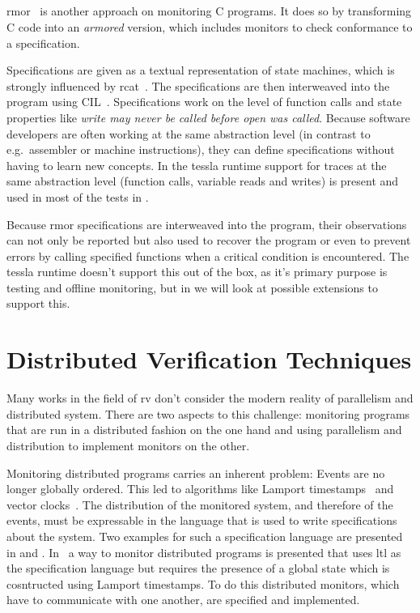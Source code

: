 \subsection{}
\label{sec:related:c_programs:rmor}

\gls{rmor}~\citep{Havelund2008} is another approach on monitoring C programs.
It does so by transforming C code into an \emph{armored} version, which includes monitors to check conformance to a specification.

Specifications are given as a textual representation of state machines, which is strongly influenced by \gls{rcat}~\citep{Smith2008}.
The specifications are then interweaved into the program using CIL~\cite{Necula2002}.
Specifications work on the level of function calls and state properties like \emph{write may never be called before open was called}.
Because software developers are often working at the same abstraction level (in contrast to e.g.\ assembler or machine instructions), they can define specifications without having to learn new concepts.
In the \gls{tessla} runtime support for traces at the same abstraction level (function calls, variable reads and writes) is present and used in most of the tests in .

Because \gls{rmor} specifications are interweaved into the program, their observations can not only be reported but also used to recover the program or even to prevent errors by calling specified functions when a critical condition is encountered.
The \gls{tessla} runtime doesn't support this out of the box, as it's primary purpose is testing and offline monitoring, but in  we will look at possible extensions to support this.

\section{Distributed Verification Techniques}
\label{sec:related:distributed}

Many works in the field of \gls{rv} don't consider the modern reality of parallelism and distributed system.
There are two aspects to this challenge: monitoring programs that are run in a distributed fashion on the one hand and using parallelism and distribution to implement monitors on the other.

Monitoring distributed programs carries an inherent problem: Events are no longer globally ordered.
This led to algorithms like Lamport timestamps~\citep{Lamport1978} and vector clocks~\citep{Fidge1988}.
The distribution of the monitored system, and therefore of the events, must be expressable in the language that is used to write specifications about the system.
Two examples for such a specification language are presented in \cite{Sen2004} and \cite{Ehrich2000}.
In~\cite{Mostafa2015} a way to monitor distributed programs is presented that uses \gls{ltl} as the specification language but requires the presence of a global state which is cosntructed using Lamport timestamps.
To do this distributed monitors, which have to communicate with one another, are specified and implemented.

